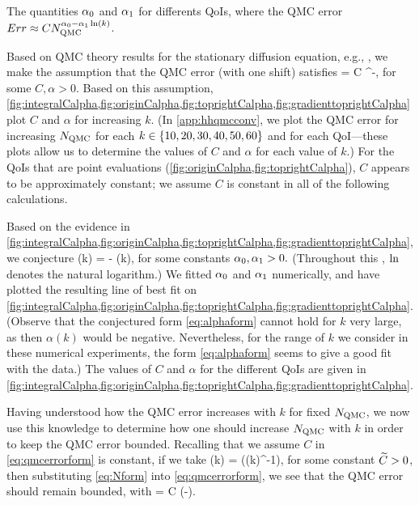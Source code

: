 \begin{table}[h!]
  \centering
  
  \caption{The quantities $\alpha_{0}$ and $\alpha_{1}$ for differents QoIs, where the QMC error $Err \approx C N_{\mathrm{QMC}}^{\alpha_{0} - \alpha_{1}\operatorname{ln}(k)}$.}\label{tab:qmcalpha}
  \end{table}

Based on QMC theory results for the stationary diffusion equation, e.g., \cite[Equation 4.2]{GrKuNuScSl:11}, we make the assumption that the QMC error (with one shift) satisfies
\beq\label{eq:qmcerrorform}
 = C \NQMC^{-\alpha},
\eeq
for some $C, \alpha > 0.$ Based on this assumption, \cref{fig:integralCalpha,fig:originCalpha,fig:toprightCalpha,fig:gradienttoprightCalpha} plot $C$ and $\alpha$ for increasing $k$. (In \cref{app:hhqmcconv}, we plot the QMC error for increasing $N_{\mathrm{QMC}}$ for each $k \in \set{10,20,30,40,50,60}$ and for each QoI---these plots allow us to determine the values of $C$ and $\alpha$ for each value of $k.$) For the QoIs that are point evaluations (\cref{fig:originCalpha,fig:toprightCalpha}), $C$ appears to be approximately constant; we assume $C$ is constant in all of the following calculations.

Based on the evidence in \cref{fig:integralCalpha,fig:originCalpha,fig:toprightCalpha,fig:gradienttoprightCalpha}, we conjecture
\beq\label{eq:alphaform}
\alpha(k) = \alphaz - \alphao\loge(k),
\eeq
for some constants $\alpha_{0},\alpha_{1} > 0.$ (Throughout this , $\operatorname{ln}$ denotes the natural logarithm.) We fitted $\alpha_{0}$ and $\alpha_{1}$ numerically, and have plotted the resulting line of best fit on \cref{fig:integralCalpha,fig:originCalpha,fig:toprightCalpha,fig:gradienttoprightCalpha}. (Observe that the conjectured form \cref{eq:alphaform} cannot hold for $k$ very large, as then $\alpha(k)$ would be negative. Nevertheless, for the range of $k$ we consider in these numerical experiments, the form \cref{eq:alphaform} seems to give a good fit with the data.) The values of $C$ and $\alpha$ for the different QoIs are given in \cref{fig:integralCalpha,fig:originCalpha,fig:toprightCalpha,fig:gradienttoprightCalpha}.

Having understood how the QMC error increases with $k$ for fixed $N_{\mathrm{QMC}}$, we now use this knowledge to determine how one should increase $N_{\mathrm{QMC}}$ with $k$ in order to keep the QMC error bounded. Recalling that we assume $C$ in \cref{eq:qmcerrorform} is constant, if we take
\beq\label{eq:Nform}
\NQMC(k) = \exp\mleft(\Ctilde \alpha(k)^{-1}\mright),
\eeq
for some constant $\widetilde{C} > 0$, then substituting \cref{eq:Nform} into \cref{eq:qmcerrorform}, we see that the QMC error should remain bounded, with
\beqs
{} = C \exp\mleft(-\Ctilde\mright).
\eeqs

